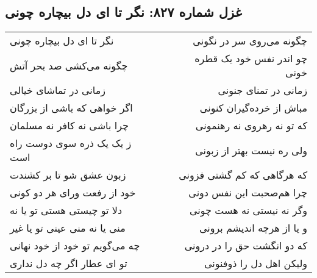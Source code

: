 \begin{center}
\section*{غزل شماره ۸۲۷: نگر تا ای دل بیچاره چونی}
\label{sec:827}
\begin{longtable}{l p{0.5cm} r}
نگر تا ای دل بیچاره چونی
&&
چگونه می‌روی سر در نگونی
\\
چگونه می‌کشی صد بحر آتش
&&
چو اندر نفس خود یک قطره خونی
\\
زمانی در تماشای خیالی
&&
زمانی در تمنای جنونی
\\
اگر خواهی که باشی از بزرگان
&&
مباش از خرده‌گیران کنونی
\\
چرا باشی نه کافر نه مسلمان
&&
که تو نه رهروی نه رهنمونی
\\
ز یک یک ذره سوی دوست راه است
&&
ولی ره نیست بهتر از زبونی
\\
زبون عشق شو تا بر کشندت
&&
که هرگاهی که کم گشتی فزونی
\\
خود از رفعت ورای هر دو کونی
&&
چرا هم‌صحبت این نفس دونی
\\
دلا تو چیستی هستی تو یا نه
&&
وگر نه نیستی نه هست چونی
\\
منی یا نه منی عینی تو یا غیر
&&
و یا از هرچه اندیشم برونی
\\
چه می‌گویم تو خود از خود نهانی
&&
که دو انگشت حق را در درونی
\\
تو ای عطار اگر چه دل نداری
&&
ولیکن اهل دل را ذوفنونی
\\
\end{longtable}
\end{center}
